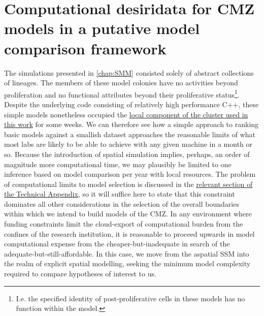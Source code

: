 \section{Computational desiridata for CMZ models in a putative model comparison framework}
The simulations presented in \autoref{chap:SMM} consisted solely of abstract collections of lineages. The members of these model colonies have no activities beyond proliferation and no functional attributes beyond their proliferative status\footnote{I.e. the specified identity of post-proliferative cells in these models has no function within the model.}. Despite the underlying code consisting of relatively high performance C++, these simple models nonetheless occupied the \hyperref[cluster]{local component of the cluster used in this work} for some weeks. We can therefore see how a simple approach to ranking basic models against a smallish dataset approaches the reasonable limits of what most labs are likely to be able to achieve with any given machine in a month or so. Because the introduction of spatial simulation implies, perhaps, an order of magnitude more computational time, we may plausibly be limited to one inference based on model comparison per year with local resources. The problem of computational limits to model selection is discussed in the \hyperref[complimits]{relevant section of the Technical Appendix}, so it will suffice here to state that this constraint dominates all other considerations in the selection of the overall boundaries within which we intend to build models of the CMZ. In any environment where funding constraints limit the cloud-export of computational burden from the confines of the research institution, it is reasonable to proceed upwards in model computational expense from the cheaper-but-inadequate in search of the adequate-but-still-affordable. In this case, we move from the aspatial SSM into the realm of explicit spatial modelling, seeking the minimum model complexity required to compare hypotheses of interest to us.

